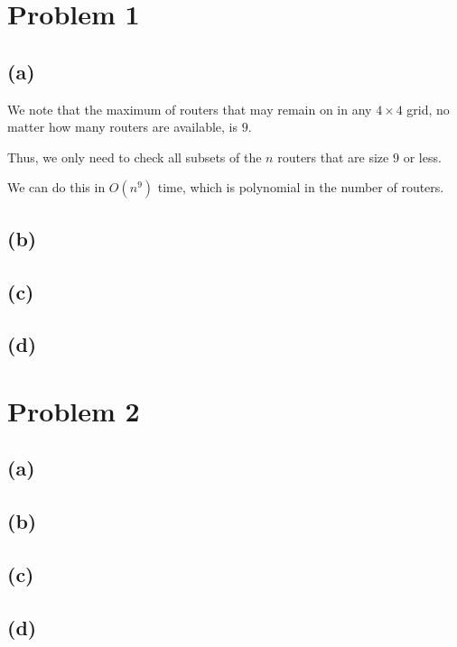 \documentclass{6046}
\author{Matthew Feng}
\begin{document}
\section*{Problem 1}
\subsection*{(a)}
We note that the maximum of routers that
may remain on in any $4 \times 4$ grid,
no matter how many routers are available,
is $9$.

Thus, we only need to check all subsets of the
$n$ routers that are size $9$ or less.

We can do this in $O(n^9)$ time, which is polynomial
in the number of routers.

\subsection*{(b)}

\subsection*{(c)}

\subsection*{(d)}

\section*{Problem 2}
\subsection*{(a)}
\subsection*{(b)}
\subsection*{(c)}
\subsection*{(d)}
\end{document}
